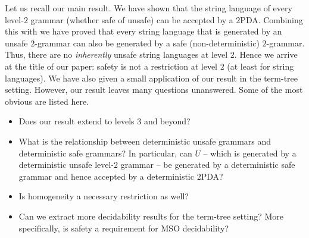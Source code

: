 Let us recall our main result. We have shown that the string
language of every level-$2$ grammar (whether safe of unsafe) can
be accepted by a $2$PDA. Combining this with \cite{DG86} we have
proved that every string language that is generated by an unsafe
$2$-grammar can also be generated by a safe (non-deterministic)
$2$-grammar. Thus, there are no \emph{inherently} unsafe string
languages at level $2$. Hence we arrive at the title of our paper:
safety is not a restriction at level $2$ (at least for string
languages). We have also given a small application of our result in the term-tree setting. However, our
result leaves many questions unanswered. Some of the most obvious
are listed here. 
\begin{itemize}
\item Does our result extend to levels $3$ and beyond?
\item What is the relationship between deterministic unsafe grammars and
deterministic safe grammars? In particular, can $U$ -- which is
generated by a deterministic unsafe level-$2$ grammar -- be
generated by a deterministic safe grammar and hence accepted by a
deterministic $2$PDA?
\item Is homogeneity a necessary restriction as well?
\item Can we extract more decidability results for
the term-tree setting? More specifically, is safety a requirement for
MSO decidability?
\end{itemize}


